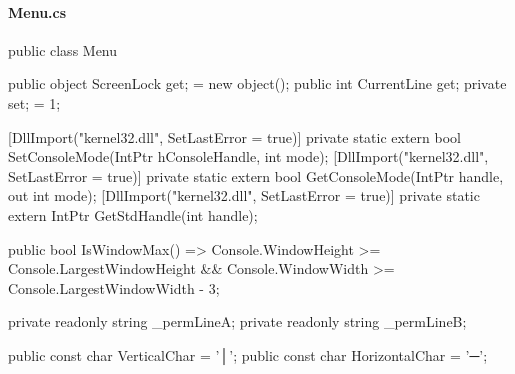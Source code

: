 \begin{flushleft}
\pagebreak
    
    \paragraph{Menu.cs}    
    \begin{cscode}
public class Menu
{
    public object ScreenLock { get; } = new object();
    public int CurrentLine { get; private set; } = 1;

    [DllImport("kernel32.dll", SetLastError = true)]
    private static extern bool SetConsoleMode(IntPtr hConsoleHandle, int mode);
    [DllImport("kernel32.dll", SetLastError = true)]
    private static extern bool GetConsoleMode(IntPtr handle, out int mode);
    [DllImport("kernel32.dll", SetLastError = true)]
    private static extern IntPtr GetStdHandle(int handle);

    public bool IsWindowMax() => Console.WindowHeight >= Console.LargestWindowHeight && Console.WindowWidth >= Console.LargestWindowWidth - 3;

    private readonly string _permLineA;
    private readonly string _permLineB;

    public const char VerticalChar = '│';
    public const char HorizontalChar = '─';

}
\end{cscode}
\end{flushleft}
